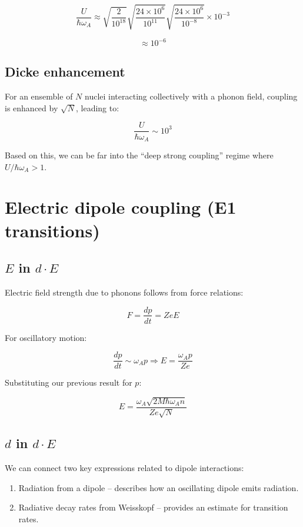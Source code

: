 \documentclass[
]{article}
\renewcommand{\[}{\begin{equation}}
\renewcommand{\]}{\end{equation}}
\providecommand{\tightlist}{%
  \setlength{\itemsep}{0pt}\setlength{\parskip}{0pt}}
\begin{document}
\[
\frac{U}{\hbar \omega_A} \approx \sqrt{\frac{2}{10^{18}}} \sqrt{\frac{24 \times 10^6}{10^{11}}} \sqrt{\frac{24 \times 10^6}{10^{-8}}} \times 10^{-3}
\]

\[
\approx 10^{-6}
\]

\subsection{Dicke enhancement}\label{dicke-enhancement}

For an ensemble of \(N\) nuclei interacting collectively with a phonon
field, coupling is enhanced by \(\sqrt{N}\), leading to:

\[
\frac{U}{\hbar \omega_A} \sim 10^{3}
\]

Based on this, we can be far into the ``deep strong coupling'' regime
where \(U/\hbar \omega_A > 1\).

\section{Electric dipole coupling (E1
transitions)}\label{electric-dipole-coupling-e1-transitions}

\subsection{\texorpdfstring{\(E\) in
\(d \cdot E\)}{E in d \textbackslash cdot E}}\label{e-in-d-cdot-e}

Electric field strength due to phonons follows from force relations:

\[
F = \frac{dp}{dt} = ZeE
\]

For oscillatory motion:

\[
\frac{dp}{dt} \sim \omega_A p \Rightarrow E = \frac{\omega_A p}{Ze}
\]

Substituting our previous result for \(p\):

\[
E = \frac{\omega_A \sqrt{2M \hbar \omega_A n}}{Ze \sqrt{N}} \label{eq:E}
\]

\subsection{\texorpdfstring{\(d\) in
\(d \cdot E\)}{d in d \textbackslash cdot E}}\label{d-in-d-cdot-e}

We can connect two key expressions related to dipole interactions:

\begin{enumerate}
\def\labelenumi{\arabic{enumi}.}
\tightlist
\item
  Radiation from a dipole -- describes how an oscillating dipole emits
  radiation.\\
\item
  Radiative decay rates from Weisskopf -- provides an estimate for
  transition rates.
\end{enumerate}
\end{document}
